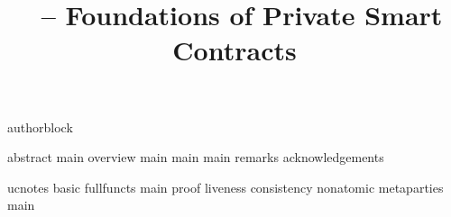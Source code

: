 \usepackage{packages}
\usepackage{contract}
\usepackage{notation}
\graphicspath{{fig/}}
\makeatletter
\newif\iffull\fulltrue
\makeatother
{authorblock}
\title{\kachina\ -- Foundations of Private Smart Contracts}


\maketitle
\todosum

\begingroup
\renewcommand\thefootnote{\fnsymbol{footnote}}%
\renewcommand\thempfootnote{\fnsymbol{mpfootnote}}%
%
\endgroup
{abstract}
{main}
{overview}
{main}
{main}
{main}
{remarks}
{acknowledgements}

{}


\iffull
\startappendix
{ucnotes}
{basic}
{fullfuncts}
{main}
{proof}
{liveness}
{consistency}
{nonatomic}
{metaparties}
{main}
\fi



